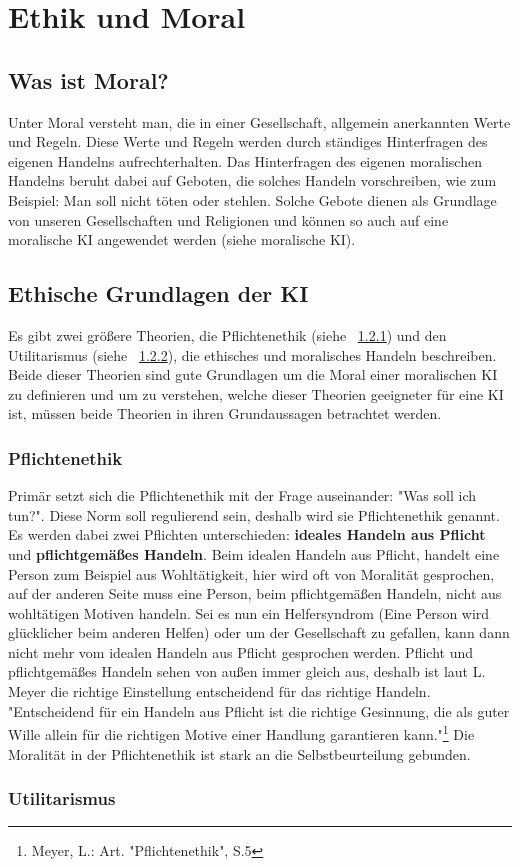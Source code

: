 \section{Ethik und Moral}\label{sec:ethik und moral}

\subsection{Was ist Moral?}\label{subsec::moral}

Unter Moral versteht man, die in einer Gesellschaft, allgemein anerkannten Werte und Regeln.
Diese Werte und Regeln werden durch ständiges Hinterfragen des eigenen Handelns aufrechterhalten.
Das Hinterfragen des eigenen moralischen Handelns beruht dabei auf Geboten, die solches Handeln vorschreiben,
wie zum Beispiel: Man soll nicht töten oder stehlen.
Solche Gebote dienen als Grundlage von unseren Gesellschaften und Religionen und können so auch auf
eine moralische KI angewendet werden (siehe moralische KI). %


\subsection{Ethische Grundlagen der KI}\label{subsec::ethische grundlagen}

Es gibt zwei größere Theorien, die Pflichtenethik (siehe ~\ref{subsubsec::pflichtenethik}) und den Utilitarismus (siehe ~\ref{subsubsec::utilitarismus}),
die ethisches und moralisches Handeln beschreiben.
Beide dieser Theorien sind gute Grundlagen um die Moral einer moralischen KI zu definieren und um zu verstehen, welche
dieser Theorien geeigneter für eine KI ist, müssen beide Theorien in ihren Grundaussagen betrachtet werden.

\subsubsection{Pflichtenethik}\label{subsubsec::pflichtenethik}

Primär setzt sich die Pflichtenethik mit der Frage auseinander: "Was soll ich tun?".
Diese Norm soll regulierend sein, deshalb wird sie Pflichtenethik genannt.
Es werden dabei zwei Pflichten unterschieden:
\textbf{ideales Handeln aus Pflicht} und \textbf{pflichtgemäßes Handeln}.
Beim idealen Handeln aus Pflicht, handelt eine Person zum Beispiel aus Wohltätigkeit,
hier wird oft von Moralität gesprochen, auf der
anderen Seite muss eine Person, beim pflichtgemäßen Handeln, nicht aus wohltätigen Motiven handeln.
Sei es nun ein Helfersyndrom (Eine Person wird glücklicher beim anderen Helfen) oder um der Gesellschaft zu gefallen,
kann dann nicht mehr vom idealen Handeln aus Pflicht gesprochen werden.
Pflicht und pflichtgemäßes Handeln sehen von außen immer gleich aus, deshalb ist laut L. Meyer die richtige
Einstellung entscheidend für das richtige Handeln.
"Entscheidend für ein Handeln aus Pflicht ist die richtige Gesinnung,
die als guter Wille allein für die richtigen Motive einer Handlung garantieren kann."\footnote{Meyer, L.: Art. "Pflichtenethik", S.5}
Die Moralität in der Pflichtenethik ist stark an die Selbstbeurteilung gebunden.


\subsubsection{Utilitarismus}\label{subsubsec::utilitarismus}